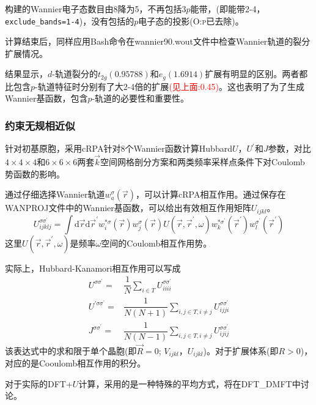 构建的\textrm{Wannier}电子态数目由8降为5，不再包括3$p$能带，(即能带2-4，\texttt{exclude\_bands=1-4})，没有包括的$p$电子态的投影(\textsc{O:p}已去除)。

计算结束后，同样应用\textrm{Bash}命令在\textrm{wannier90.wout}文件中检查\textrm{Wannier}轨道的裂分扩展情况。

结果显示，$d$-轨道裂分的$t_{2g}(0.95788)$和$e_g(1.6914)$扩展有明显的区别。两者都比包含$p$-轨道特征时分别有了大2-4倍的扩展\textcolor{red}{(见上面:0.45)}。这也表明了为了生成\textrm{Wannier}基函数，包含$p$-轨道的必要性和重要性。

\subsubsection{约束无规相近似}
针对初基原胞，采用\textrm{cRPA}针对8个\textrm{Wannier}函数计算\textrm{Hubbard}$U$，$U^{\prime}$和$J$参数，对比$4\times4\times4$和$6\times6\times6$两套$\vec k$空间网格剖分方案和两类频率采样点条件下对\textrm{Coulomb}势函数的影响。

通过仔细选择\textrm{Wannier}轨道$w_a^{\sigma}(\vec r)$，可以计算\textrm{cRPA}相互作用。通过保存在\textrm{WANPROJ}文件中的\textrm{Wannier}基函数，可以给出有效相互作用矩阵$U_{ijkl}$。
\begin{displaymath}
	U_{ijklj}^{\sigma\sigma^{\prime}}=\int\mathrm{d}\vec r\mathrm{d}\vec r^{\prime}w_i^{\ast\sigma}(\vec r)w_j^{\sigma}(\vec r)U(\vec r,\vec r^{\prime},\omega)w_k^{\ast\sigma^{\prime}}(\vec r^{\prime})w_l^{\sigma^{\prime}}(\vec r^{\prime})
\end{displaymath}
这里$U(\vec r,\vec r^{\prime},\omega)$是频率$\omega$空间的\textrm{Coulomb}相互作用势。

实际上，\textrm{Hubbard-Kanamori}相互作用可以写成
\begin{displaymath}
	\begin{aligned}
		U^{\sigma\sigma^{\prime}}=&\dfrac1N\sum_{i\in T}U_{iiii}^{\sigma\sigma^{\prime}}\\
		U^{\prime\sigma\sigma^{\prime}}=&\dfrac1{N(N+1)}\sum_{i,j\in T,i\neq j}U_{ijji}^{\sigma\sigma^{\prime}}\\
		J^{\sigma\sigma^{\prime}}=&\dfrac1{N(N-1)}\sum_{i,j\in T,i\neq j}U_{ijij}^{\sigma\sigma^{\prime}}
	\end{aligned}
\end{displaymath}
该表达式中的求和限于单个晶胞(即$\vec R=0$; $V_{ijkl}$，$U_{ijkl}$)。对于扩展体系(即$R>0$)，对应的是\textrm{Cooulomb}相互作用的积分。

对于实际的\textrm{DFT+}$U$计算，采用的是一种特殊的平均方式，将在\textrm{DFT_DMFT}中讨论。

